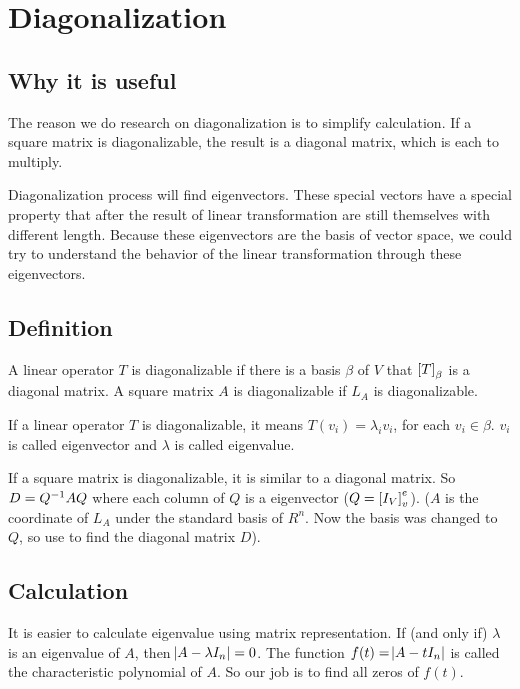 \section{Diagonalization}

\subsection{Why it is useful}


The reason we do research on diagonalization is to simplify calculation. If a square matrix is diagonalizable, the result is a diagonal matrix, which is each to multiply.

Diagonalization process will find eigenvectors. These special vectors have a special property that after the result of linear transformation are still themselves with different length. Because these eigenvectors are the basis of vector space, we could try to understand the behavior of the linear transformation through these eigenvectors.

\subsection{Definition}


A linear operator $T$ is diagonalizable if there is a basis $\beta$ of $V$ that $\coordinate{T}_\beta$ is a diagonal matrix. A square matrix $A$ is diagonalizable if $L_A$ is diagonalizable.

If a linear operator $T$ is diagonalizable, it means $T(v_i) = \lambda_i v_i$, for each $v_i \in \beta$. $v_i$ is called eigenvector and $\lambda$ is called eigenvalue.

If a square matrix is diagonalizable, it is similar to a diagonal matrix. So $D = {Q}^{-1} A Q$ where each column of $Q$ is a eigenvector ($Q = \coordinate{I_V}_v^e$). ($A$ is the coordinate of $L_A$ under the standard basis of $R^n$. Now the basis was changed to $Q$, so use  to find the diagonal matrix $D$).



\subsection{Calculation}

It is easier to calculate eigenvalue using matrix representation. If (and only if) $\lambda$ is an eigenvalue of $A$, then $\abs{A - \lambda I_n} = 0$. The function $f(t) = \abs{A - t I_n}$ is called the characteristic polynomial of $A$. So our job is to find all zeros of $f(t)$.


